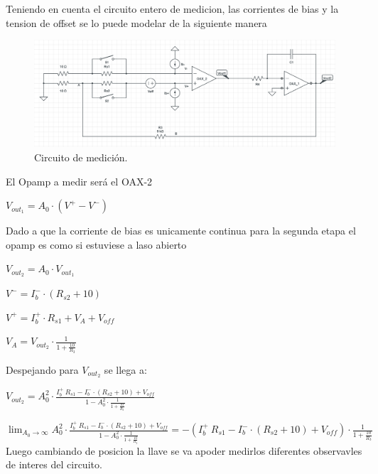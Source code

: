 Teniendo en cuenta el circuito entero de medicion, las corrientes de bias y la tension de offset se lo puede modelar de la siguiente manera
\begin{figure}[H]	
	\centering
	\includegraphics[width=\textwidth]{Ejercicio3/imagenes/Medicion.PNG}
	\caption{Circuito de medición.}
	\label{fig:Medicion}
\end{figure}
El Opamp a medir será el OAX-2
\begin{center}$V_{out_1}=A_0 \cdot (V^+ - V^-)$\\\end{center}
Dado a que la corriente de bias es unicamente continua para la segunda etapa el opamp es como si estuviese a laso abierto\\
\begin{center}$V_{out_2}=A_0 \cdot V_{out_1}$\\\end{center}
\begin{center}$V^-=I_b^- \cdot (R_{s2}+10)$\\\end{center}
\begin{center}$V^+=I_b^+ \cdot R_{s1} +V_A+V_{off}$\\\end{center}
\begin{center}$V_A=V_{out_2} \cdot \frac{1}{1+\frac{10}{R_3}}$\\\end{center}
Despejando para $V_{out_2}$ se llega a:
\begin{center}$V_{out_2}=A_0^2  \cdot \frac{I_b^+ \ R_{s1} -I_b^-\cdot (R_{s2}+10)+V_{off}}{1-A_0^2 \cdot \frac{1}{1+\frac{10}{R_3}}}$\\\end{center}
$\lim_{A_0\to\infty} A_0^2  \cdot \frac{I_b^+ \ R_{s1} -I_b^-\cdot (R_{s2}+10)+V_{off}}{1-A_0^2 \cdot \frac{1}{1+\frac{10}{R_3}}}=-(I_b^+ \ R_{s1} -I_b^-\cdot (R_{s2}+10)+V_{off})\cdot \frac{1}{1+\frac{10}{R_3}} $
Luego cambiando de posicion la llave se va apoder medirlos diferentes observavles de interes del circuito.\\
